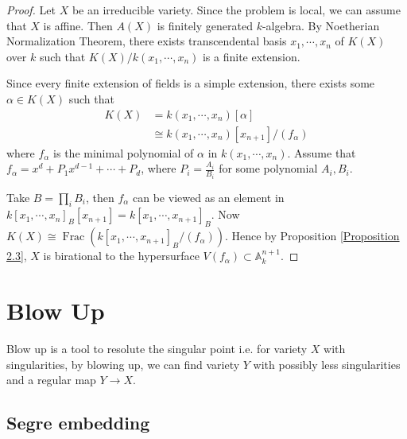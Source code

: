 \documentclass{ctexart}
\newcommand{\fraction}{\operatorname{Frac}}
\begin{document}
\begin{proof}
    Let $X$ be an irreducible variety.
    Since the problem is local, we can assume that $X$ is affine.
    Then $A(X)$ is finitely generated $k$-algebra.
    By Noetherian Normalization Theorem, there exists transcendental basis $x_{1}, \cdots, x_{n}$ of $K(X)$ over $k$ such that $K(X)/k(x_{1}, \cdots, x_{n})$ is a finite extension.
    \par
    Since every finite extension of fields is a simple extension,
    there exists some $\alpha\in K(X)$ such that
    \begin{equation}
        \begin{split}
            K(X) & = k(x_{1}, \cdots, x_{n})[\alpha] \\
            & \cong k(x_{1}, \cdots, x_{n})[x_{n + 1}]/(f_{\alpha})
        \end{split}
    \end{equation}
    where $f_{\alpha}$ is the minimal polynomial of $\alpha$ in $k(x_{1}, \cdots, x_{n})$.
    Assume that $f_{\alpha} = x^{d} + P_{1}x^{d - 1} + \cdots + P_{d}$, where $P_{i} = \frac{A_{i}}{B_{i}}$ for some polynomial $A_{i}, B_{i}$.
    \par
    Take $B = \prod_{i} B_{i}$, then $f_{\alpha}$ can be viewed as an element in $k[x_{1}, \cdots, x_{n}]_{B}[x_{n + 1}] = k[x_{1}, \cdots, x_{n + 1}]_{B}$.
    Now $K(X) \cong \fraction(k[x_{1}, \cdots, x_{n + 1}]_{B}/(f_{\alpha}))$.
    Hence by Proposition \ref{Proposition 2.3}, $X$ is birational to the hypersurface $V(f_{\alpha}) \subset \mathbb{A}_{k}^{n + 1}$.
\end{proof}

\section{Blow Up}
\label{section:Blow_Up}

Blow up is a tool to resolute the singular point i.e. for variety $X$ with singularities,
by blowing up, we can find variety $Y$ with possibly less singularities and a regular map $Y \rightarrow X$.

\subsection{Segre embedding}
\label{subsection:Blow_Up_Segre_embedding}
\end{document}
